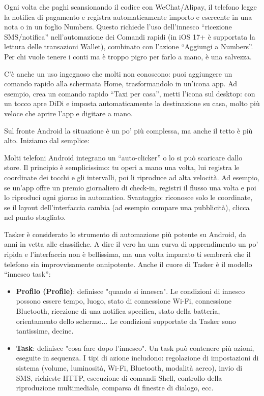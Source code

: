 
Ogni volta che paghi scansionando il codice con WeChat/Alipay, il telefono legge la notifica di pagamento e registra automaticamente importo e esercente in una nota o in un foglio Numbers. Questo richiede l'uso dell'innesco “ricezione SMS/notifica” nell'automazione dei Comandi rapidi (in iOS 17+ è supportata la lettura delle transazioni Wallet), combinato con l'azione “Aggiungi a Numbers”. Per chi vuole tenere i conti ma è troppo pigro per farlo a mano, è una salvezza.

C'è anche un uso ingegnoso che molti non conoscono: puoi aggiungere un comando rapido alla schermata Home, trasformandolo in un'icona app. Ad esempio, crea un comando rapido “Taxi per casa”, metti l'icona sul desktop: con un tocco apre DiDi e imposta automaticamente la destinazione su casa, molto più veloce che aprire l'app e digitare a mano.


Sul fronte Android la situazione è un po' più complessa, ma anche il tetto è più alto. Iniziamo dal semplice:


Molti telefoni Android integrano un “auto-clicker” o lo si può scaricare dallo store. Il principio è semplicissimo: tu operi a mano una volta, lui registra le coordinate dei tocchi e gli intervalli, poi li riproduce ad alta velocità. Ad esempio, se un'app offre un premio giornaliero di check-in, registri il flusso una volta e poi lo riproduci ogni giorno in automatico. Svantaggio: riconosce solo le coordinate, se il layout dell'interfaccia cambia (ad esempio compare una pubblicità), clicca nel punto sbagliato.


Tasker è considerato lo strumento di automazione più potente su Android, da anni in vetta alle classifiche. A dire il vero ha una curva di apprendimento un po' ripida e l'interfaccia non è bellissima, ma una volta imparato ti sembrerà che il telefono sia improvvisamente onnipotente. Anche il cuore di Tasker è il modello “innesco task”:

\begin{itemize}
  \item \textbf{Profilo (Profile)}: definisce "quando si innesca". Le condizioni di innesco possono essere tempo, luogo, stato di connessione Wi-Fi, connessione Bluetooth, ricezione di una notifica specifica, stato della batteria, orientamento dello schermo... Le condizioni supportate da Tasker sono tantissime, decine.
  \item \textbf{Task}: definisce "cosa fare dopo l'innesco". Un task può contenere più azioni, eseguite in sequenza. I tipi di azione includono: regolazione di impostazioni di sistema (volume, luminosità, Wi-Fi, Bluetooth, modalità aereo), invio di SMS, richieste HTTP, esecuzione di comandi Shell, controllo della riproduzione multimediale, comparsa di finestre di dialogo, ecc.
\end{itemize}

